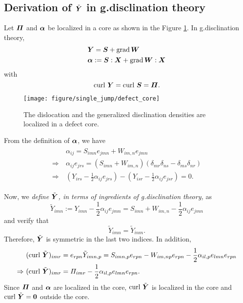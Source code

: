 \documentclass[11pt,letterpaper]{article}
\begin{document}
 \subsection{Derivation of $\tilde{\bfY}$ in g.disclination theory}
 
  Let $\bfPi$ and $\bfalpha$ be localized in a core as shown in the Figure \ref{fig:burgers_core}. In g.disclination theory,
\begin{equation*}
\begin{aligned}
&\bfY  = \bfS + \grad \bfW \\
&\bfalpha := \bfS :\bfX + \grad \bfW : \bfX
\end{aligned}
\end{equation*}
with 
\begin{equation*}
\curl \, \bfY = \curl \, \bfS =\bfPi.
\end{equation*}

\begin{figure}
\centering
\texttt{[image: figure/single\_jump/defect\_core]}
\caption{The dislocation and the generalized disclination densities are localized in a defect core.}
\label{fig:burgers_core}
\end{figure}


From the definition of $\bfalpha$, we have 
\begin{eqnarray*}
\begin{aligned}
&\alpha_{ij} = S_{imn}e_{jmn}+W_{im,n}e_{jmn} \\
\Rightarrow \  & \alpha_{ij}e_{jrs} = \left( S_{imn}+W_{im,n} \right) \left(\delta_{mr}\delta_{ns}-\delta_{ms}\delta_{nr}\right) \\
\Rightarrow \  & \left( Y_{irs} - \frac{1}{2} \alpha_{ij}e_{jrs} \right) - \left( Y_{isr} - \frac{1}{2} \alpha_{ij}e_{jsr}\right) = 0.
\end{aligned} 
\end{eqnarray*}

Now, we \emph{define $\tilde{\bfY}$, in terms of ingredients of g.disclination theory,} as 
\begin{equation}\label{eqn:tildey}
\tilde{Y}_{imn} := Y_{imn}-\frac{1}{2}\alpha_{ij}e_{jmn} = S_{imn}+W_{im,n}-\frac{1}{2}\alpha_{ij}e_{jmn}
\end{equation}
and verify that
\begin{equation*}
\tilde{Y}_{imn} = \tilde{Y}_{inm}.
\end{equation*}
Therefore, $\tilde{\bfY}$ is symmetric in the last two indices. In addition, 
\begin{eqnarray*}
\begin{aligned}
&(\curl \, \tilde{\bfY})_{imr} = e_{rpn}\tilde{Y}_{imn,p} = S_{imn,p}e_{rpn} - W_{im,np}e_{rpn}-\frac{1}{2}\alpha_{il,p}e_{lmn}e_{rpn} \\
\Rightarrow \ & (\curl \, \tilde{\bfY})_{imr} = \Pi_{imr}-\frac{1}{2}\alpha_{il,p}e_{lmn}e_{rpn}.
\end{aligned}
\end{eqnarray*}
Since $\bfPi$ and $\bfalpha$ are localized in the core, $\curl \, \tilde{\bfY}$ is localized in the core and $\curl \, \tilde{\bfY} = \bf0$ outside the core.
\end{document}
